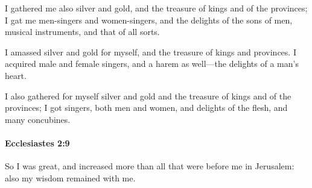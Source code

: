 			\begin{versebox}
					\item[BHS] 
					\item[LXX] 
					\item[ASV] I gathered me also silver and gold, and the treasure of kings and of the provinces; I gat me men-singers and women-singers, and the delights of the sons of men, musical instruments, and that of all sorts.
					\item[NIV] I amassed silver and gold for myself, and the treasure of kings and provinces. I acquired male and female singers, and a harem as well—the delights of a man’s heart.
					\item[NRSV] I also gathered for myself silver and gold and the treasure of kings and of the provinces; I got singers, both men and women, and delights of the flesh, and many concubines.
			\end{versebox}

		\paragraph{Ecclesiastes 2:9} %
			\label{ECCLESIASTES-2-9}

			So I was great, and increased more than all that were before me in Jerusalem: also my wisdom remained with me.

